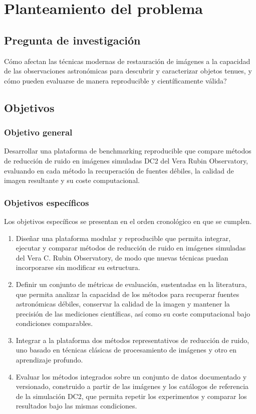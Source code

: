 \chapter{Planteamiento del problema}

\section{Pregunta de investigaci\'on}

\textquestiondown C\'omo afectan las t\'ecnicas modernas de restauraci\'on de im\'agenes a la capacidad de las observaciones astron\'omicas para descubrir y caracterizar objetos tenues, y c\'omo pueden evaluarse de manera reproducible y cient\'ificamente v\'alida?

\section{Objetivos}

\subsection{Objetivo general}

Desarrollar una plataforma de benchmarking reproducible que compare m\'etodos de reducci\'on de ruido en im\'agenes simuladas DC2 del Vera Rubin Observatory, evaluando en cada m\'etodo la recuperaci\'on de fuentes d\'ebiles, la calidad de imagen resultante y su coste computacional.

\subsection{Objetivos espec\'ificos}

Los objetivos espec\'ificos se presentan en el orden cronol\'ogico en que se cumplen.

\begin{enumerate}
  \item Diseñar una plataforma modular y reproducible que permita integrar, ejecutar y comparar m\'etodos de reducci\'on de ruido en im\'agenes simuladas del Vera C. Rubin Observatory, de modo que nuevas t\'ecnicas puedan incorporarse sin modificar su estructura.
  \item Definir un conjunto de m\'etricas de evaluaci\'on, sustentadas en la literatura, que permita analizar la capacidad de los m\'etodos para recuperar fuentes astron\'omicas d\'ebiles, conservar la calidad de la imagen y mantener la precisi\'on de las mediciones cient\'ificas, as\'i como su coste computacional bajo condiciones comparables.
  \item Integrar a la plataforma dos m\'etodos representativos de reducci\'on de ruido, uno basado en t\'ecnicas cl\'asicas de procesamiento de im\'agenes y otro en aprendizaje profundo.
  \item Evaluar los m\'etodos integrados sobre un conjunto de datos documentado y versionado, construido a partir de las im\'agenes y los cat\'alogos de referencia de la simulaci\'on DC2, que permita repetir los experimentos y comparar los resultados bajo las mismas condiciones.
\end{enumerate}

